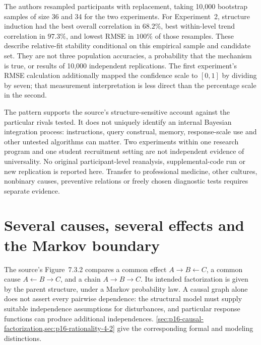 The authors resampled participants with replacement, taking 10,000
bootstrap samples of size 36 and 34 for the two experiments. For
Experiment~2, structure induction had the best overall correlation in
\(68.2\%\), best within-level trend correlation in \(97.3\%\),
and lowest RMSE in \(100\%\) of those resamples. These describe
relative-fit stability conditional on this empirical sample and candidate
set. They are not three population accuracies, a probability that the
mechanism is true, or results of 10,000 independent replications.
The first experiment's RMSE calculation additionally mapped the confidence
scale to \([0,1]\) by dividing by seven; that measurement interpretation
is less direct than the percentage scale in the second.
\cite[pp.~291--293, tables~2--3]{MederMayrhoferWaldmann2014StructureInduction}

The pattern supports the source's structure-sensitive account against the
particular rivals tested. It does not uniquely identify an internal
Bayesian integration process: instructions, query construal, memory,
response-scale use and other untested algorithms can matter. Two
experiments within one research program and one student recruitment
setting are not independent evidence of universality. No original
participant-level reanalysis, supplemental-code run or new replication
is reported here. Transfer to professional medicine, other cultures,
nonbinary causes, preventive relations or freely chosen diagnostic tests
requires separate evidence.

\section{Several causes, several effects and the Markov boundary}
\label{sec:p19-rat73-networks}

The source's Figure~7.3.2 compares a common effect
\(A\to B\leftarrow C\), a common cause \(A\leftarrow B\to C\),
and a chain \(A\to B\to C\). Its intended factorization is given
by the parent structure, under a Markov probability law. A causal graph
alone does not assert every pairwise dependence: the structural model
must supply suitable independence assumptions for disturbances, and
particular response functions can produce additional independences.
\cref{sec:p16-causal-factorization,sec:p16-rationality-4-2} give the
corresponding formal and modeling distinctions.
\cite[sec.~4, pp.~452--453]{MederMayrhofer2021DiagnosticCausal}

